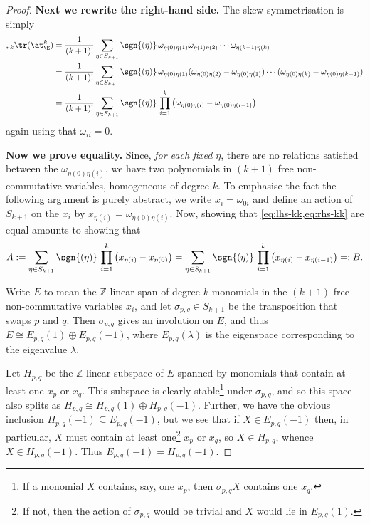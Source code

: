 \begin{proof}
            \medskip
            \textbf{Next we rewrite the right-hand side.}
            The skew-symmetrisation is simply
            \begin{align}\label{eq:rhs-kk}
                \ss_k\tr(\at^k_\E) &= \frac{1}{(k+1)!}\sum_{\eta\in S_{k+1}}\sgn{(\eta)}\,\omega_{\eta(0)\eta(1)}\omega_{\eta(1)\eta(2)}\cdots\omega_{\eta(k-1)\eta(k)}\nonumber\\
                &= \frac{1}{(k+1)!}\sum_{\eta\in S_{k+1}}\sgn{(\eta)}\,\omega_{\eta(0)\eta(1)}(\omega_{\eta(0)\eta(2)}-\omega_{\eta(0)\eta(1)})\cdots(\omega_{\eta(0)\eta(k)}-\omega_{\eta(0)\eta(k-1)})\nonumber\\
                &= \frac{1}{(k+1)!}\sum_{\eta\in S_{k+1}}\sgn{(\eta)}\,\prod_{i=1}^k\big(\omega_{\eta(0)\eta(i)}-\omega_{\eta(0)\eta(i-1)}\big)
            \end{align}
            again using that $\omega_{ii}=0$.

            \medskip
            \textbf{Now we prove equality.}
            Since, \emph{for each fixed $\eta$}, there are no relations satisfied between the $\omega_{\eta(0)\eta(i)}$, we have two polynomials in $(k+1)$ free non-commutative variables, homogeneous of degree $k$.
            To emphasise the fact the following argument is purely abstract, we write $x_i=\omega_{0i}$ and define an action of $S_{k+1}$ on the $x_i$ by $x_{\eta(i)}=\omega_{\eta(0)\eta(i)}$.
            Now, showing that \cref{eq:lhs-kk,eq:rhs-kk} are equal amounts to showing that
            \begin{equation}\label{eq:a-b-kk}
                A := \sum_{\eta\in S_{k+1}}\sgn{(\eta)}\,\prod_{i=1}^k\big(x_{\eta(i)}-x_{\eta(0)}\big) = \sum_{\eta\in S_{k+1}}\sgn{(\eta)}\,\prod_{i=1}^k\big(x_{\eta(i)}-x_{\eta(i-1)}\big) =: B.
            \end{equation}

            Write $E$ to mean the $\mathbb{Z}$-linear span of degree-$k$ monomials in the $(k+1)$ free non-commutative variables $x_i$, and let $\sigma_{p,q}\in S_{k+1}$ be the transposition that swaps $p$ and $q$.
            Then $\sigma_{p,q}$ gives an involution on $E$, and thus $E\cong E_{p,q}(1)\oplus E_{p,q}(-1)$, where $E_{p,q}(\lambda)$ is the eigenspace corresponding to the eigenvalue $\lambda$.

            Let $H_{p,q}$ be the $\mathbb{Z}$-linear subspace of $E$ spanned by monomials that contain at least one $x_p$ or $x_q$.
            This subspace is clearly stable\footnote{If a monomial $X$ contains, say, one $x_p$, then $\sigma_{p,q}X$ contains one $x_q$.} under $\sigma_{p,q}$, and so this space also splits as $H_{p,q}\cong H_{p,q}(1)\oplus H_{p,q}(-1)$.
            Further, we have the obvious inclusion $H_{p,q}(-1)\subseteq E_{p,q}(-1)$, but we see that if $X\in E_{p,q}(-1)$ then, in particular, $X$ must contain at least one\footnote{If not, then the action of $\sigma_{p,q}$ would be trivial and $X$ would lie in $E_{p,q}(1)$.} $x_p$ or $x_q$, so $X\in H_{p,q}$, whence $X\in H_{p,q}(-1)$.
            Thus $E_{p,q}(-1)=H_{p,q}(-1)$.


\end{proof}
